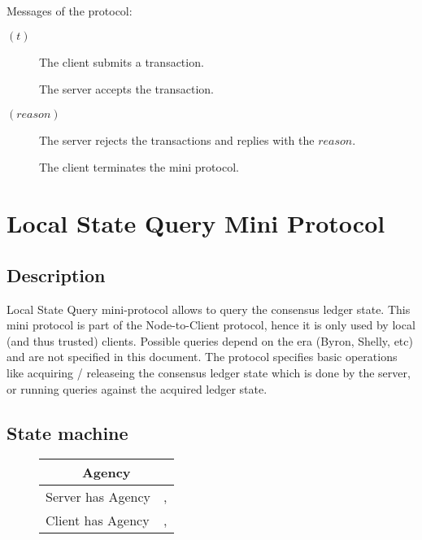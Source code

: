 Messages of the protocol:
\begin{description}
\item [\SubmitTx{} {\boldmath $(t)$}]
      The client submits a transaction.
\item [\AcceptTx]
      The server accepts the transaction.
\item [\RejectTx{} {\boldmath $(reason)$}]
      The server rejects the transactions and replies with the $reason$.
\item [\MsgDone]
      The client terminates the mini protocol.
\end{description}

\section{Local State Query Mini Protocol}
\label{local-state-query-protocol}
\newcommand{\Acquiring}{\state{Acquiring}}
\newcommand{\Acquired}{\state{Acquired}}
\newcommand{\Querying}{\state{Querying}}
\newcommand{\MsgAcquire}{\trans{MsgAcquire}}
\newcommand{\MsgAcquired}{\trans{MsgAcquired}}
\newcommand{\MsgFailure}{\trans{MsgFailure}}
\newcommand{\MsgQuery}{\trans{MsgQuery}}
\newcommand{\MsgResult}{\trans{MsgResult}}
\newcommand{\MsgRelease}{\trans{MsgRelease}}
\newcommand{\MsgReAcquire}{\trans{MsgReAcquire}}

\subsection{Description}
Local State Query mini-protocol allows to query the consensus \/ ledger state.
This mini protocol is part of the Node-to-Client protocol, hence it is only
used by local (and thus trusted) clients.  Possible queries depend on the era
(Byron, Shelly, etc) and are not specified in this document.  The protocol
specifies basic operations like acquiring / releaseing the consensus \/ ledger
state which is done by the server, or running queries against the acquired
ledger state.

\subsection{State machine}

\begin{figure}[h]
\begin{tabular}{|l|l|}
  \hline
  \multicolumn{2}{|c|}{Agency} \\ \hline
  Server has Agency & \Idle{}, \Acquired{} \\ \hline
  Client has Agency & \Acquiring{}, \Querying{} \\ \hline
\end{tabular}
\end{figure}

